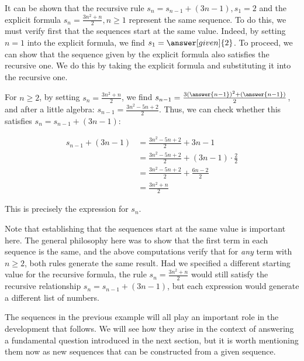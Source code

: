 \documentclass{ximera}
\begin{document}
\begin{remark}
It can be shown that the recursive rule $s_n = s_{n-1} + (3n-1),  s_1 =2$ and the explicit formula $s_n = \frac{3n^2+n}{2}
, n \geq 1$ represent the same sequence.  To do this, we must verify first that the sequences start at the same value.  Indeed, by setting $n=1$ into the explicit formula, we find $s_1 = \answer[given]{2}$.  To proceed, we can show that the sequence given by the explicit formula also satisfies the recursive one.  We do this by taking the explicit formula and substituting it into the recursive one.  

For $n \geq 2$, by setting $s_n = \frac{3n^2+n}{2}$, we find $s_{n-1} = \frac{3\left(\answer{n-1}\right)^2+\left(\answer{n-1}\right)}{2}$, and after a little algebra: $s_{n-1} = \frac{3n^2-5n+2}{2}$.  Thus, we can check whether this satisfies $s_n = s_{n-1} + (3n-1)$:

\begin{align*}
 s_{n-1} + (3n-1) &= \frac{3n^2-5n+2}{2} +3n-1 \\
 &=  \frac{3n^2-5n+2}{2} +(3n-1) \cdot \frac{2}{2} \\ 
 &= \frac{3n^2-5n+2}{2} + \frac{6n-2}{2} \\
 &= \frac{3n^2+n}{2} 
\end{align*}

This is precisely the expression for $s_n$.

Note that establishing that the sequences start at the same value is important here.  The general philosophy here was to show that the first term in each sequence is the same, and the above computations verify that for \emph{any} term with $n \geq 2$, both rules generate the same result.  Had we specified a different starting value for the recursive formula, the rule $s_n = \frac{3n^2+n}{2}$ would still satisfy the recursive relationship $s_n = s_{n-1} + (3n-1)$, but each expression would generate a different list of numbers.

\end{remark}

\begin{remark}
The sequences in the previous example will all play an important role in the development that follows.  We will see how they arise in the context of answering a fundamental question introduced in the next section, but it is worth mentioning them now as new sequences that can be constructed from a given sequence.
\end{remark}
\end{document}
